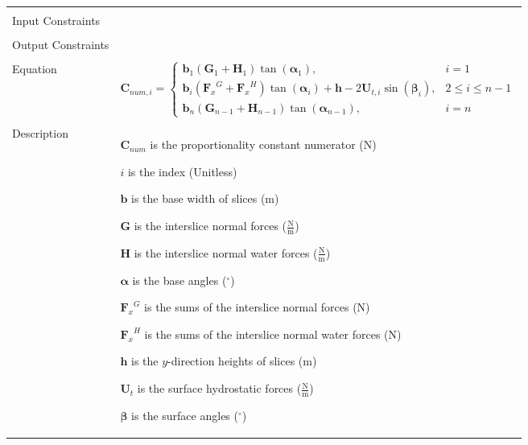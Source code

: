 \documentclass[12pt]{article}
\begin{document}
\begin{minipage}{\textwidth}
\begin{tabular}{>{\raggedright}p{}>{\raggedright\arraybackslash}p{}}
\\ \midrule \\
Input Constraints & 
\\ \midrule \\
Output Constraints & 
\\ \midrule \\
Equation & \begin{displaymath}
           {\mathbf{C}_{num,i}}=\begin{cases}
                                {\mathbf{b}}_{1} \left({\mathbf{G}}_{1}+{\mathbf{H}}_{1}\right) \tan\left({\mathbf{α}}_{1}\right), & i=1\\
{\mathbf{b}}_{i} \left({{\mathbf{F}_{x}}^{G}}+{{\mathbf{F}_{x}}^{H}}\right) \tan\left({\mathbf{α}}_{i}\right)+\mathbf{h} -2 {\mathbf{U}_{t,i}} \sin\left({\mathbf{β}}_{i}\right), & 2\leq{}i\leq{}n-1\\
{\mathbf{b}}_{n} \left({\mathbf{G}}_{n-1}+{\mathbf{H}}_{n-1}\right) \tan\left({\mathbf{α}}_{n-1}\right), & i=n
                                \end{cases}
           \end{displaymath}
\\ \midrule \\
Description & \begin{symbDescription}
              \item{${\mathbf{C}_{num}}$ is the proportionality constant numerator (N)}
              \item{$i$ is the index (Unitless)}
              \item{$\mathbf{b}$ is the base width of slices (m)}
              \item{$\mathbf{G}$ is the interslice normal forces ($\frac{\text{N}}{\text{m}}$)}
              \item{$\mathbf{H}$ is the interslice normal water forces ($\frac{\text{N}}{\text{m}}$)}
              \item{$\mathbf{α}$ is the base angles (${}^{\circ}$)}
              \item{${{\mathbf{F}_{x}}^{G}}$ is the sums of the interslice normal forces (N)}
              \item{${{\mathbf{F}_{x}}^{H}}$ is the sums of the interslice normal water forces (N)}
              \item{$\mathbf{h}$ is the $y$-direction heights of slices (m)}
              \item{${\mathbf{U}_{t}}$ is the surface hydrostatic forces ($\frac{\text{N}}{\text{m}}$)}
              \item{$\mathbf{β}$ is the surface angles (${}^{\circ}$)}

\end{symbDescription}
\end{tabular}
\end{minipage}
\end{document}

